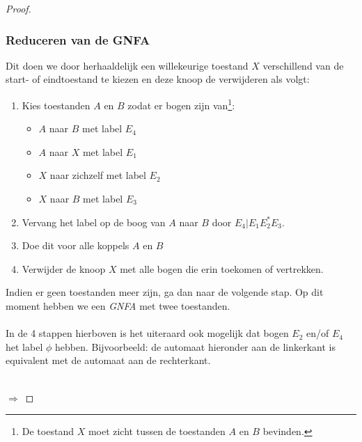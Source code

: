 \begin{proof}
\subsubsection*{Reduceren van de GNFA}
Dit doen we door herhaaldelijk een willekeurige toestand $X$ verschillend van de start- of eindtoestand te kiezen en deze knoop de verwijderen als volgt:
\begin{enumerate}
\item Kies toestanden $A$ en $B$ zodat er bogen zijn van\footnote{De toestand $X$ moet zicht tussen de toestanden $A$ en $B$ bevinden.}:
\begin{itemize}
\item $A$ naar $B$ met label $E_4$
\item $A$ naar $X$ met label $E_1$
\item $X$ naar zichzelf met label $E_2$
\item $X$ naar $B$ met label $E_3$
\end{itemize}
\item Vervang het label op de boog van $A$ naar $B$ door $E_4 | E_1 E_2^* E_3$.
\item Doe dit voor alle koppels $A$ en $B$
\item Verwijder de knoop $X$ met alle bogen die erin toekomen of vertrekken.
\end{enumerate}
Indien er geen toestanden meer zijn, ga dan naar de volgende stap. Op dit moment hebben we een \emph{GNFA} met twee toestanden.\\
\\
In de 4 stappen hierboven is het uiteraard ook mogelijk dat bogen $E_2$ en/of $E_4$ het label $\phi$ hebben. Bijvoorbeeld: de automaat hieronder aan de linkerkant is  equivalent met de automaat aan de rechterkant.
\\
\\
\begin{minipage}{.5\textwidth}
\center
{}
\end{minipage}%
$\Longrightarrow$
\begin{minipage}{.5\textwidth}
\center
{}
\end{minipage}
\end{proof}
